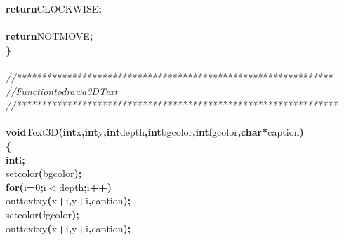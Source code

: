 \documentclass[a4paper, 10pt]{article}
\newcommand\SPC{\hspace*{0.6em}}
\newcommand{\CppAComment}[1]{\textit{\textcolor[rgb]{0.2,0.6,1}{#1}}}
\newcommand{\CppAIdentifier}[1]{#1}
\newcommand{\CppANumber}[1]{\textcolor[rgb]{0.5,0,0.5}{#1}}
\newcommand{\CppAReservedWord}[1]{\textbf{#1}}
\newcommand{\CppASpace}[1]{\colorbox[rgb]{1,1,1}{#1}}
\newcommand{\CppASymbol}[1]{\textbf{\textcolor[rgb]{1,0,0}{#1}}}
\begin{document}
\begin{ttfamily}
\CppASpace{\SPC \SPC }\CppAReservedWord{return}\CppASpace{\SPC }\CppAIdentifier{CLOCKWISE}\CppASymbol{;}\\
\\
\CppASpace{\SPC }\CppAReservedWord{return}\CppASpace{\SPC }\CppAIdentifier{NOTMOVE}\CppASymbol{;}\\
\CppASymbol{\}}\\
\\
\CppAComment{//***************************************************************}\\
\CppAComment{//\SPC \SPC \SPC Function\SPC to\SPC draw\SPC a\SPC 3D\SPC Text}\\
\CppAComment{//****************************************************************}\\
\\
\CppAReservedWord{void}\CppASpace{\SPC }\CppAIdentifier{Text3D}\CppASymbol{(}\CppAReservedWord{int}\CppASpace{\SPC }\CppAIdentifier{x}\CppASymbol{,}\CppASpace{\SPC }\CppAReservedWord{int}\CppASpace{\SPC }\CppAIdentifier{y}\CppASymbol{,}\CppASpace{\SPC }\CppAReservedWord{int}\CppASpace{\SPC }\CppAIdentifier{depth}\CppASymbol{,}\CppASpace{\SPC }\CppAReservedWord{int}\CppASpace{\SPC }\CppAIdentifier{bgcolor}\CppASymbol{,}\CppASpace{\SPC }\CppAReservedWord{int}\CppASpace{\SPC }\CppAIdentifier{fgcolor}\CppASymbol{,}\CppASpace{\SPC }\CppAReservedWord{char}\CppASpace{\SPC }\CppASymbol{*}\CppAIdentifier{caption}\CppASymbol{)}\\
\CppASymbol{\{}\\
\CppASpace{\SPC }\CppAReservedWord{int}\CppASpace{\SPC }\CppAIdentifier{i}\CppASymbol{;}\\
\CppASpace{\SPC }\CppAIdentifier{setcolor}\CppASymbol{(}\CppAIdentifier{bgcolor}\CppASymbol{)}\CppASymbol{;}\\
\CppASpace{\SPC }\CppAReservedWord{for}\CppASymbol{(}\CppAIdentifier{i}\CppASymbol{=}\CppANumber{0}\CppASymbol{;}\CppAIdentifier{i}\CppASymbol{$<$}\CppAIdentifier{depth}\CppASymbol{;}\CppAIdentifier{i}\CppASymbol{++}\CppASymbol{)}\\
\CppASpace{\SPC \SPC }\CppAIdentifier{outtextxy}\CppASymbol{(}\CppAIdentifier{x}\CppASymbol{+}\CppAIdentifier{i}\CppASymbol{,}\CppAIdentifier{y}\CppASymbol{+}\CppAIdentifier{i}\CppASymbol{,}\CppAIdentifier{caption}\CppASymbol{)}\CppASymbol{;}\\
\CppASpace{\SPC }\CppAIdentifier{setcolor}\CppASymbol{(}\CppAIdentifier{fgcolor}\CppASymbol{)}\CppASymbol{;}\\
\CppASpace{\SPC }\CppAIdentifier{outtextxy}\CppASymbol{(}\CppAIdentifier{x}\CppASymbol{+}\CppAIdentifier{i}\CppASymbol{,}\CppAIdentifier{y}\CppASymbol{+}\CppAIdentifier{i}\CppASymbol{,}\CppAIdentifier{caption}\CppASymbol{)}\CppASymbol{;}\\

\end{ttfamily}
\end{document}
